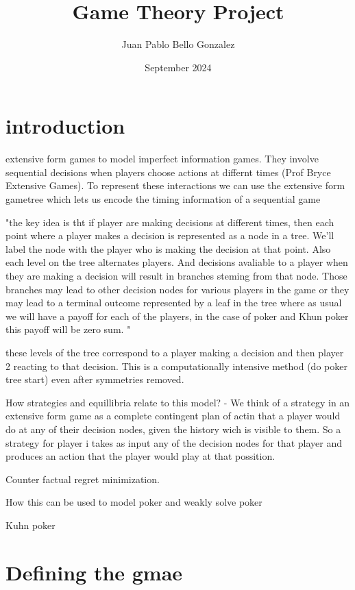 \documentclass{article}
\title{Game Theory Project}
\author{Juan Pablo Bello Gonzalez}
\date{September 2024}
\begin{document}
\maketitle

\section{introduction}

extensive form games to model imperfect information games. They involve sequential decisions when players choose actions at differnt times (Prof Bryce Extensive Games).
To represent these interactions we can use the extensive form gametree which lets us encode the timing information of a sequential game

"the key idea is tht if player are making decisions at different times, then each point where a player makes a decision is represented as a node in a tree. We'll label the node with the player who is making the decision at that point. Also each level on the tree alternates players. And decisions avaliable to a player when they are making a decision will result in branches steming from that node. Those branches may lead to other decision nodes for various players in the game or they may lead to a terminal outcome represented by a leaf in the tree where as usual we will have a payoff for each of the players, in the case of poker and Khun poker this payoff will be zero sum. "

these levels of the tree correspond to a player making a decision and then player 2 reacting to that decision. This is a computationally intensive method (do poker tree start) even after symmetries removed. 

How strategies and equillibria relate to this model?
- We think of a strategy in an extensive form game as a complete contingent plan of actin that a player would do at any of their decision nodes, given the history wich is visible to them. 
So a strategy for player i takes as input any of the decision nodes for that player and produces an action that the player would play at that possition. 


Counter factual regret minimization. 

How this can be used to model poker and weakly solve poker 


Kuhn poker 

\section{Defining the gmae}
\end{document}
